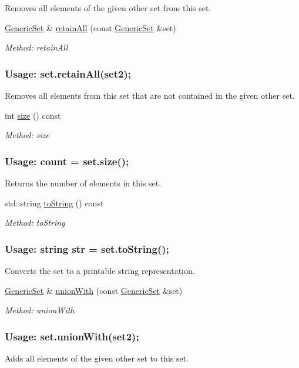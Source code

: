 \begin{DoxyCompactItemize}
\begin{DoxyCompactList}
Removes all elements of the given other set from this set. \end{DoxyCompactList}\item 
\mbox{\hyperlink{classstanfordcpplib_1_1collections_1_1GenericSet}{Generic\+Set}} \& \mbox{\hyperlink{classstanfordcpplib_1_1collections_1_1GenericSet_a15b39be914ac3e2ecb6f0d14ab893f9a}{retain\+All}} (const \mbox{\hyperlink{classstanfordcpplib_1_1collections_1_1GenericSet}{Generic\+Set}} \&set)
\begin{DoxyCompactList}\small\item\em Method\+: retain\+All \subsubsection*{Usage\+: set.\+retain\+All(set2); }

Removes all elements from this set that are not contained in the given other set. \end{DoxyCompactList}\item 
int \mbox{\hyperlink{classstanfordcpplib_1_1collections_1_1GenericSet_af9593d4a5ff4274efaf429cb4f9e57cc}{size}} () const
\begin{DoxyCompactList}\small\item\em Method\+: size \subsubsection*{Usage\+: count = set.\+size(); }

Returns the number of elements in this set. \end{DoxyCompactList}\item 
std\+::string \mbox{\hyperlink{classstanfordcpplib_1_1collections_1_1GenericSet_a1fe5121d6528fdea3f243321b3fa3a49}{to\+String}} () const
\begin{DoxyCompactList}\small\item\em Method\+: to\+String \subsubsection*{Usage\+: string str = set.\+to\+String(); }

Converts the set to a printable string representation. \end{DoxyCompactList}\item 
\mbox{\hyperlink{classstanfordcpplib_1_1collections_1_1GenericSet}{Generic\+Set}} \& \mbox{\hyperlink{classstanfordcpplib_1_1collections_1_1GenericSet_affa3b4d177e1794dbb3e6a414a5ec2b3}{union\+With}} (const \mbox{\hyperlink{classstanfordcpplib_1_1collections_1_1GenericSet}{Generic\+Set}} \&set)
\begin{DoxyCompactList}\small\item\em Method\+: union\+With \subsubsection*{Usage\+: set.\+union\+With(set2); }

Adds all elements of the given other set to this set. \end{DoxyCompactList}\end{DoxyCompactItemize}


